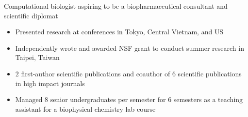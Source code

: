 

\begin{cventries}
\vspace{-4.0mm}

  \cventry
    {} %
    {} %
    {} %
    {} %
    {
      \begin{cvitems} %
        \item {Computational biologist aspiring to be a biopharmaceutical consultant and scientific diplomat}
        \begin{itemize}
       	 	\item Presented research at conferences in Tokyo, Central Vietnam, and US  
       	 	\item Independently wrote and awarded NSF grant to conduct summer research in Taipei, Taiwan
         	\item 2 first-author scientific publications and coauthor of 6 scientific publications in high impact journals
         	\item Managed 8 senior undergraduates per semester for 6 semesters as a teaching assistant for a biophysical chemistry lab course
        \end{itemize}
      \end{cvitems}
    }
\vspace{-4.0mm}
\end{cventries}
